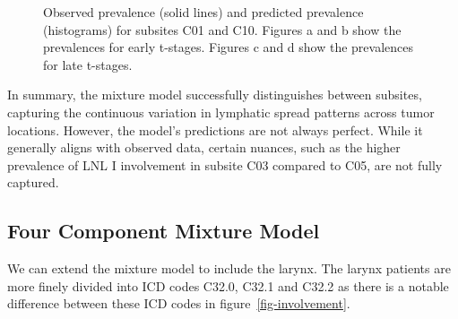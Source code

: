 \documentclass[
  sn-mathphys-num,
]{sn-jnl}
\begin{document}
\begin{figure}
\begin{minipage}{\linewidth}
{}

\subcaption{\label{fig-oropharynx_C01_late}}

\end{minipage}%
\newline
\begin{minipage}{\linewidth}


\subcaption{\label{fig-oropharynx_C10_late}}

\end{minipage}%

\caption{\label{fig-oropharynx}Observed prevalence (solid lines) and
predicted prevalence (histograms) for subsites C01 and C10. Figures a
and b show the prevalences for early t-stages. Figures c and d show the
prevalences for late t-stages.}

\end{figure}%

In summary, the mixture model successfully distinguishes between
subsites, capturing the continuous variation in lymphatic spread
patterns across tumor locations. However, the model's predictions are
not always perfect. While it generally aligns with observed data,
certain nuances, such as the higher prevalence of LNL I involvement in
subsite C03 compared to C05, are not fully captured.

\subsection{Four Component Mixture Model}\label{sec-4comp}

We can extend the mixture model to include the larynx. The larynx
patients are more finely divided into ICD codes C32.0, C32.1 and C32.2
as there is a notable difference between these ICD codes in
figure~\ref{fig-involvement}.
\end{document}

